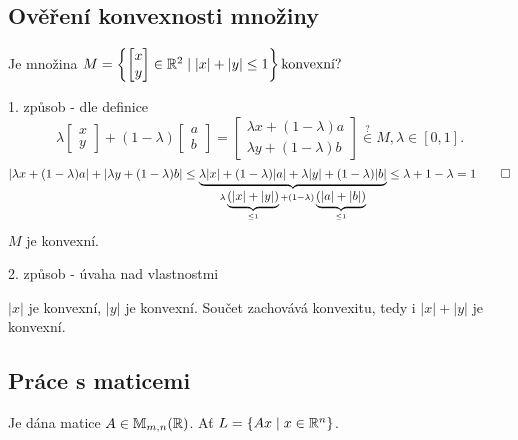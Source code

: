 \subsection{Ověření konvexnosti množiny}
\begin{multicols}{2}
    Je množina $M = \left\lbrace 
    \begin{bmatrix}
        x \\
        y
    \end{bmatrix} \in \mathbb{R}^2 \mid |x| + |y| \leq 1 \right\rbrace \text{konvexní?}$

\columnbreak

\hspace*{2cm}
\end{multicols}

1. způsob - dle definice
\[
    \lambda 
    \begin{bmatrix}
        x\\
        y     
    \end{bmatrix} + (1-\lambda)
    \begin{bmatrix}
        a\\
        b
    \end{bmatrix} = 
    \begin{bmatrix}
        \lambda x  + (1-\lambda) a \\
        \lambda y + (1-\lambda) b
    \end{bmatrix} \overset{?}{\in} M, \lambda \in [0,1].
\]
\[
    |\lambda x + (1-\lambda)a| + |\lambda y + (1-\lambda)b| \leq 
    \underbrace{\lambda |x| + (1-\lambda)|a| + \lambda |y| + (1-\lambda)|b|}_{\lambda
    \underbrace{(|x|+|y|)}_{\leq1} + (1-\lambda)\underbrace{(|a|+|b|)}_{\leq 1}} \leq \lambda + 1 - \lambda = 1 \qed
\]
$M$ je konvexní.

2. způsob - úvaha nad vlastnostmi

$|x|$ je konvexní, $|y|$ je konvexní. Součet zachovává konvexitu, tedy i $|x| + |y|$ je konvexní.

\subsection{Práce s maticemi}
Je dána matice $A \in \mathbb{M}_{m,n} (\mathbb{R})$. Ať $L = \left\lbrace Ax \mid x \in \mathbb{R}^n \right\rbrace$. 

